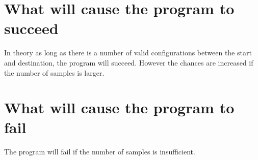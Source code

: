 \documentclass[12pt]{article}
\begin{document}
    \section{What will cause the program to succeed}

    In theory as long as there is a number of valid configurations between the start and destination, the program will succeed. However the chances are increased if the number of samples is larger.

    \section{What will cause the program to fail}

    The program will fail if the number of samples is insufficient.
\end{document}
